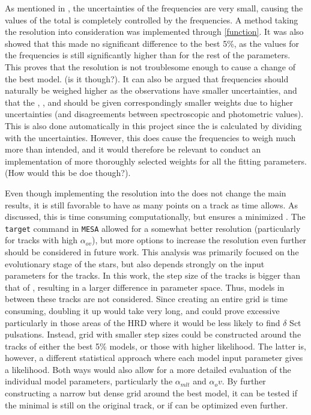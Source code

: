 \begin{itemize}
As mentioned in , the uncertainties of the frequencies are very small, causing the values of the total \chis is completely controlled by the frequencies. A method taking the resolution into consideration was implemented through \eqref{function}. It was also showed that this made no significant difference to the best 5\%, as the \chis values for the frequencies is still significantly higher than for the rest of the parameters. This proves that the resolution is not troublesome enough to cause a change of the best model. (is it though?). It can also be argued that frequencies should naturally be weighed higher as the observations have smaller uncertainties, and that the \logg, \teff, and \lum should be given correspondingly smaller weights due to higher uncertainties (and disagreements between spectroscopic and photometric values). This is also done automatically in this project since the \chis is calculated by dividing with the uncertainties. However, this does cause the frequencies to weigh much more than intended, and it would therefore be relevant to conduct an implementation of more thoroughly selected weights for all the fitting parameters. (How would this be doe though?). 

Even though implementing the resolution into the \chis does not change the main results, it is still favorable to have as many points on a track as time allows. As discussed, this is time consuming computationally, but ensures a minimized \chis. The \texttt{target} command in \texttt{MESA} allowed for a somewhat better resolution (particularly for tracks with high $\alpha_{ov}$), but more options to increase the resolution even further should be considered in future work. This analysis was primarily focused on the evolutionary stage of the stars, but also depends strongly on the input parameters for the tracks. In this work, the step size of the tracks is bigger than that of \citet{lenz2010delta}, resulting in a larger difference in parameter space. Thus, models in between these tracks are not considered. Since creating an entire grid is time consuming, doubling it up would take very long, and could prove excessive particularly in those areas of the HRD where it would be less likely to find $\delta$ Sct pulsations. Instead, grid with smaller step sizes could be constructed around the tracks of either the best 5\% models, or those with higher likelihood. The latter is, however, a different statistical approach where each model input parameter gives a likelihood. Both ways would also allow for a more detailed evaluation of the individual model parameters, particularly the $\alpha_{mlt}$ and $\alpha_ov$. By further constructing a narrow but dense grid around the best model, it can be tested if the minimal \chis is still on the original track, or if \chis can be optimized even further.  


\end{itemize}
